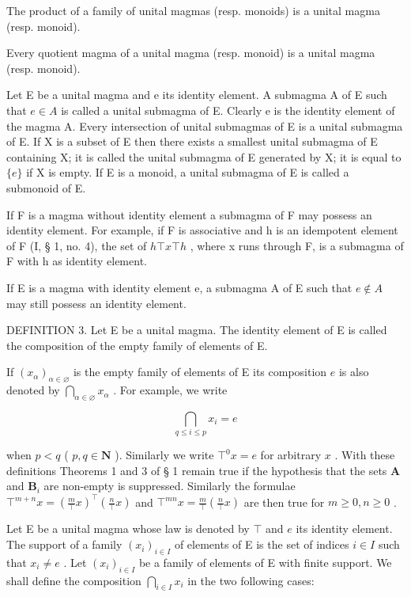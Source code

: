 The product of a family of unital magmas (resp. monoids) is a unital magma (resp. monoid).

Every quotient magma of a unital magma (resp. monoid) is a unital magma (resp. monoid).

Let E be a unital magma and e its identity element. A submagma A of E such that \(e \in A\) is called a unital submagma of E. Clearly e is the identity element of the magma A. Every intersection of unital submagmas of E is a unital submagma of E. If X is a subset of E then there exists a smallest unital submagma of E containing X; it is called the unital submagma of E generated by X; it is equal to \(\{e\}\) if X is empty. If E is a monoid, a unital submagma of E is called a submonoid of E.

If F is a magma without identity element a submagma of F may possess an identity element. For example, if F is associative and h is an idempotent element of F (I, § 1, no. 4), the set of \(h \top x \top h\) , where x runs through F, is a submagma of F with h as identity element.

If E is a magma with identity element e, a submagma A of E such that \(e \notin A\) may still possess an identity element.

DEFINITION 3. Let E be a unital magma. The identity element of E is called the composition of the empty family of elements of E.

If \((x_{\alpha})_{\alpha \in \varnothing}\) is the empty family of elements of E its composition \(e\) is also denoted by \(\bigcap_{\alpha \in \varnothing} x_{\alpha}\) . For example, we write

\[
\bigcap_ {q \leqslant i \leqslant p} x _ {i} = e
\]

when \(p < q\) ( \(p, q \in \mathbf{N}\) ). Similarly we write \(\top^0 x = e\) for arbitrary \(x\) . With these definitions Theorems 1 and 3 of § 1 remain true if the hypothesis that the sets \(\mathbf{A}\) and \(\mathbf{B}_i\) are non-empty is suppressed. Similarly the formulae \(\top^{m+n} x = \left( \frac{m}{\top} x \right)^{\top} \left( \frac{n}{\top} x \right)\) and \(\top^{mn} x = \frac{m}{\top} \left( \frac{n}{\top} x \right)\) are then true for \(m \geqslant 0, n \geqslant 0\) .

Let E be a unital magma whose law is denoted by \(\top\) and \(e\) its identity element. The support of a family \((x_{i})_{i\in I}\) of elements of E is the set of indices \(i\in I\) such that \(x_{i}\neq e\) . Let \((x_{i})_{i\in I}\) be a family of elements of E with finite support. We shall define the composition \(\bigcap_{i\in I}x_{i}\) in the two following cases:

